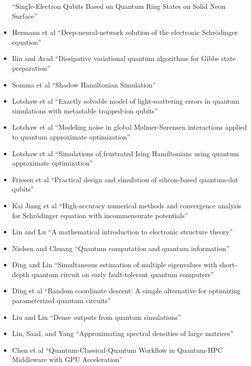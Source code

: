 \documentclass[]{article}
\begin{document}
\begin{itemize}
``Single-Electron Qubits Based on Quantum Ring States on Solid Neon Surface''
\item
Hermann et al\cite{hermann2020deep}
``Deep-neural-network solution of the electronic Schr{\"o}dinger equation''
\item
Ilin and Arad\cite{ilin2024dissipativevariationalquantumalgorithms}
``Dissipative variational quantum algorithms for Gibbs state preparation''
\item
Somma et al\cite{somma2024shadowhamiltoniansimulation}
``Shadow Hamiltonian Simulation''
\item 
Lotshaw et al\cite{PhysRevA.110.L030803}
``Exactly solvable model of light-scattering errors in quantum simulations with metastable trapped-ion qubits''
\item
Lotshaw et al\cite{PhysRevA.107.062406}
``Modeling noise in global M\o{}lmer-S\o{}rensen interactions applied to quantum approximate optimization''
\item
Lotshaw et al\cite{doi:10.1098/rsta.2021.0414}
``Simulations of frustrated Ising Hamiltonians using quantum approximate optimization''
\item Friesen et al\cite{PhysRevB.67.121301}
  ``Practical design and simulation of silicon-based quantum-dot qubits''
\item Kai Jiang et al\cite{jiang2024high}
``High-accuracy numerical methods and convergence analysis for Schr{\"o}dinger equation with incommensurate potentials''
\item Lin and Lu\cite{lin2019mathematical}
``A mathematical introduction to electronic structure theory''
\item Nielsen and Chuang\cite{nielsen2010quantum}
``Quantum computation and quantum information''
\item Ding and Lin\cite{ding2023simultaneous}
``Simultaneous estimation of multiple eigenvalues with short-depth quantum circuit on early fault-tolerant quantum computers''
\item Ding et al\cite{ding2024random}
  ``Random coordinate descent: A simple alternative for optimizing parameterized quantum circuits''
\item Liu and Lin\cite{LIU2024113213}
``Dense outputs from quantum simulations''
\item Lin, Saad, and Yang\cite{lin2016approximating}
``Approximating spectral densities of large matrices''
\item Chen et al\cite{10628380}
``Quantum-Classical-Quantum Workflow in Quantum-HPC Middleware with GPU Acceleration''

\end{itemize}
\end{document}
